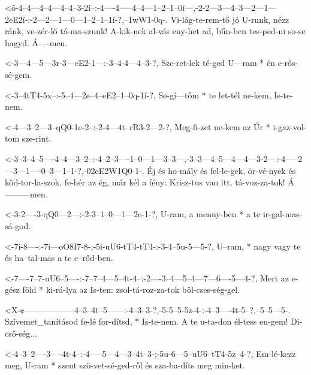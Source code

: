   {<ô-4--4---4--4---4--4--3-2í--:-4----4-----4--4---1--2--1--0í---,-2-2---3---4--3---2---1---2eE2í-:-2---2---1---0---1--2--1--1í-?,--1wW1-0q-.}
  {   Vi-lág-te-rem-tő jó U-runk, nézz ránk, ve-zér-lő tá-ma-szunk! A-kik-nek al-vás eny-het ad,     bűn-ben tes-ped-ni so-se hagyd. Á----men.}

  {<-3---4---5---3r-3---eE2-1---:-3--4-4---4--3-?,}
  {  Sze-ret-lek té-ged U---ram * én e-rős-sé-gem.}

  {<-3--4tT4-5x--:-5--4---2e--4--eE2--1--0q-1í-?,}
  {  Se-gí---tőm * te let-tél ne-kem, Is-te-nem.}

  {<-4---3--2---3--qQ0-1e-2--:-2-4---4t--rR3-2---2-?,}
  {  Meg-fi-zet ne-kem az Úr * i-gaz-vol-tom sze-rint.}


  {<-3--3--4--5----4--4---3--2--:-4--2--3----1--0---1---3--3---,-3--3---4--5---4---4---3-2---:-4-----2---3---1----0--3---1--1-?,-02eE2W1Q0-1-.}
  {  Éj és ho-mály és fel-le-gek, ör-vé-nyek és köd-tor-la-szok, fe-hér az ég, már kél a fény: Krisz-tus van itt, tá-voz-za-tok! Á---------men.}

  {<-3-2----3-qQ0---2---:-2-3--1--0---1---2e-1-?,}
  {  U-ram, a menny-ben * a te ir-gal-mas-sá-god.}

  {<-7i-8----:-7i---oO8I7-8-;-5i-uU6-tT4-tT4-:-3-4--5u-5---5-?,}
  {  U--ram, * nagy vagy  te  és ha--tal-mas   a te e--rőd-ben.}

  {<-7----7--7-uU6--5----:-7--7--4---5--4t-4--:-2----3--4---5--4---7---6----5---4-?,}
  {  Mert az e-gész föld * ki-rá-lya az Is-ten: zsol-tá-roz-za-tok böl-cses-ség-gel.}

  {<X-¢------------------4--3--4t--5------:-4--3--3-?,-5-5--5-5z-4-:-4--3----4t-5--?,--5--5---5-.}
  {   Szívemet_tanításod fe-lé for-dítsd, * Is-te-nem. A te u-ta-don él-tess en-gem!   Di-cső-ség...}

  {<-4--3--2----3----4t-4--:-4-----5---4---3--4t--3-;-5u-6---5--uU6--tT4-5z--4-?,}
  {  Em-lé-kezz meg, U-ram * szent szö-vet-sé-ged-ről és sza-ba-díts meg min-ket.}

